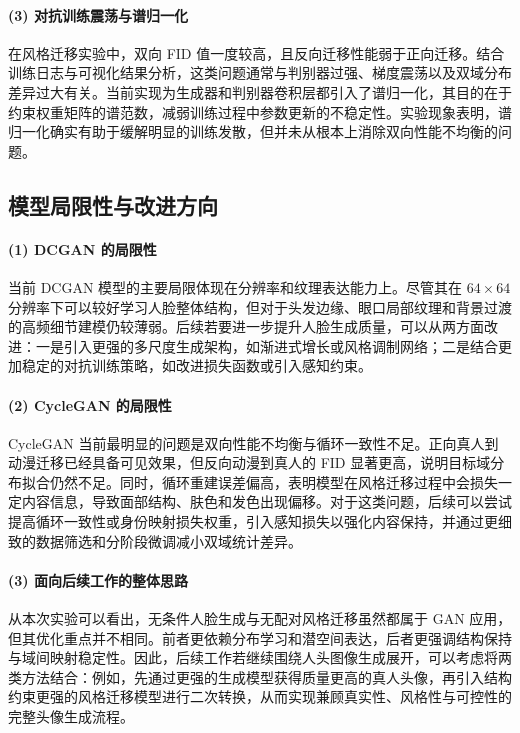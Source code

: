 \documentclass[12pt, a4paper, UTF8]{ctexart}
\begin{document}
\paragraph{(3) 对抗训练震荡与谱归一化}
在风格迁移实验中，双向 FID 值一度较高，且反向迁移性能弱于正向迁移。结合训练日志与可视化结果分析，这类问题通常与判别器过强、梯度震荡以及双域分布差异过大有关。当前实现为生成器和判别器卷积层都引入了谱归一化，其目的在于约束权重矩阵的谱范数，减弱训练过程中参数更新的不稳定性。实验现象表明，谱归一化确实有助于缓解明显的训练发散，但并未从根本上消除双向性能不均衡的问题。

\subsection{模型局限性与改进方向}
\paragraph{(1) DCGAN 的局限性}
当前 DCGAN 模型的主要局限体现在分辨率和纹理表达能力上。尽管其在 $64\times64$ 分辨率下可以较好学习人脸整体结构，但对于头发边缘、眼口局部纹理和背景过渡的高频细节建模仍较薄弱。后续若要进一步提升人脸生成质量，可以从两方面改进：一是引入更强的多尺度生成架构，如渐进式增长或风格调制网络；二是结合更加稳定的对抗训练策略，如改进损失函数或引入感知约束。

\paragraph{(2) CycleGAN 的局限性}
CycleGAN 当前最明显的问题是双向性能不均衡与循环一致性不足。正向真人到动漫迁移已经具备可见效果，但反向动漫到真人的 FID 显著更高，说明目标域分布拟合仍然不足。同时，循环重建误差偏高，表明模型在风格迁移过程中会损失一定内容信息，导致面部结构、肤色和发色出现偏移。对于这类问题，后续可以尝试提高循环一致性或身份映射损失权重，引入感知损失以强化内容保持，并通过更细致的数据筛选和分阶段微调减小双域统计差异。

\paragraph{(3) 面向后续工作的整体思路}
从本次实验可以看出，无条件人脸生成与无配对风格迁移虽然都属于 GAN 应用，但其优化重点并不相同。前者更依赖分布学习和潜空间表达，后者更强调结构保持与域间映射稳定性。因此，后续工作若继续围绕人头图像生成展开，可以考虑将两类方法结合：例如，先通过更强的生成模型获得质量更高的真人头像，再引入结构约束更强的风格迁移模型进行二次转换，从而实现兼顾真实性、风格性与可控性的完整头像生成流程。
\end{document}
